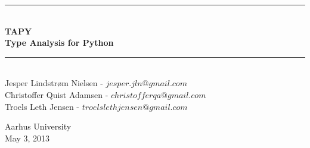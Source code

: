 \documentclass[a4paper,english, oneside, 12pt]{memoir} %
\numberwithin{equation}{section}
\begin{document}
\frontmatter
\begin{titlingpage}

\centering \parindent=0pt
\newcommand{\HRule}{\rule{\textwidth}{1mm}}
 \HRule\\[1cm]
\Huge\bfseries TAPY\\[0.7cm]
\large Type Analysis for Python \\[1cm]
\HRule\\[2cm] \large Jesper Lindstr\o m Nielsen - $jesper.jln@gmail.com$ \\
\large Christoffer Quist Adamsen - $christofferqa@gmail.com$ \\
\large Troels Leth Jensen - $troelslethjensen@gmail.com$ \\

\vspace*{2 cm}  \normalsize 

\begin{flushleft}
Aarhus University\\
May 3, 2013 \end{flushleft}




\end{titlingpage}


\mainmatter











\backmatter

\appendix


\end{document}
